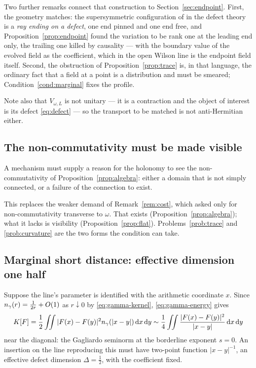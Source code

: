 Two further remarks connect that construction to Section~\ref{sec:endpoint}.
First, the geometry matches: the supersymmetric configuration of \cite{OWL} in
the defect theory is a \emph{ray ending on a defect}, one end pinned and one end
free, and Proposition~\ref{prop:endpoint} found the variation to be rank one at
the leading end only, the trailing one killed by causality --- with the boundary
value of the evolved field as the coefficient, which in the open Wilson line is
the endpoint field itself. Second, the obstruction of Proposition~\ref{prop:trace}
is, in that language, the ordinary fact that a field at a point is a distribution
and must be smeared; Condition~\ref{cond:marginal} fixes the profile.

Note also that $V_{\omega,L}$ is not unitary --- it is a contraction and the
object of interest is its defect \eqref{eq:defect} --- so the transport to be
matched is not anti-Hermitian either.

\subsection{The non-commutativity must be made visible}

\begin{condition}\label{cond:visible}
A mechanism must supply a reason for the holonomy to see the non-commutativity of
Proposition~\ref{prop:algebra}: either a domain that is not simply connected, or a
failure of the connection to exist.
\end{condition}

This replaces the weaker demand of Remark~\ref{rem:cost}, which asked only for
non-commutativity transverse to $\omega$. That exists
(Proposition~\ref{prop:algebra}); what it lacks is visibility
(Proposition~\ref{prop:flat}). Problems~\ref{prob:trace} and \ref{prob:curvature}
are the two forms the condition can take.

\subsection{Marginal short distance: effective dimension one half}

\begin{condition}[Marginality]\label{cond:marginal}
Suppose the line's parameter is identified with the arithmetic coordinate $x$.
Since $n_{\gamma}(r)=\frac1{2r}+O(1)$ as $r\downarrow0$ by \eqref{eq:gamma-kernel},
\eqref{eq:gamma-energy} gives
\[
 K[F]=\frac12\iint|F(x)-F(y)|^2n_{\gamma}(|x-y|)\,\mathrm d x\,\mathrm d y
 \sim\frac14\iint\frac{|F(x)-F(y)|^2}{|x-y|}\,\mathrm d x\,\mathrm d y
\]
near the diagonal: the Gagliardo seminorm at the borderline exponent $s=0$. An
insertion on the line reproducing this must have two-point function $|x-y|^{-1}$,
an effective defect dimension $\Delta=\frac12$, with the coefficient fixed.
\end{condition}

